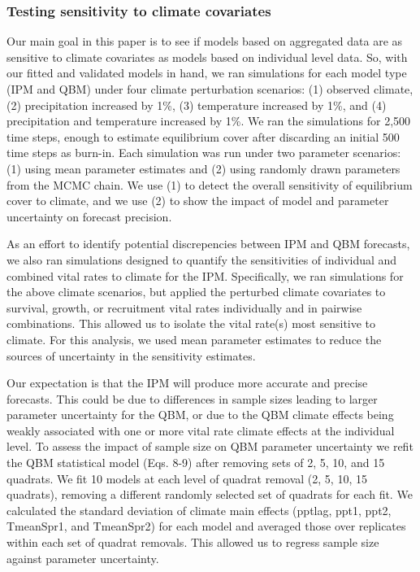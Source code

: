\documentclass[12pt,]{article}
\begin{document}
\subsubsection{Testing sensitivity to climate
covariates}\label{testing-sensitivity-to-climate-covariates}

Our main goal in this paper is to see if models based on aggregated data
are as sensitive to climate covariates as models based on individual
level data. So, with our fitted and validated models in hand, we ran
simulations for each model type (IPM and QBM) under four climate
perturbation scenarios: (1) observed climate, (2) precipitation
increased by 1\%, (3) temperature increased by 1\%, and (4)
precipitation and temperature increased by 1\%. We ran the simulations
for 2,500 time steps, enough to estimate equilibrium cover after
discarding an initial 500 time steps as burn-in. Each simulation was run
under two parameter scenarios: (1) using mean parameter estimates and
(2) using randomly drawn parameters from the MCMC chain. We use (1) to
detect the overall sensitivity of equilibrium cover to climate, and we
use (2) to show the impact of model and parameter uncertainty on
forecast precision.

As an effort to identify potential discrepencies between IPM and QBM
forecasts, we also ran simulations designed to quantify the
sensitivities of individual and combined vital rates to climate for the
IPM. Specifically, we ran simulations for the above climate scenarios,
but applied the perturbed climate covariates to survival, growth, or
recruitment vital rates individually and in pairwise combinations. This
allowed us to isolate the vital rate(s) most sensitive to climate. For
this analysis, we used mean parameter estimates to reduce the sources of
uncertainty in the sensitivity estimates.

Our expectation is that the IPM will produce more accurate and precise
forecasts. This could be due to differences in sample sizes leading to
larger parameter uncertainty for the QBM, or due to the QBM climate
effects being weakly associated with one or more vital rate climate
effects at the individual level. To assess the impact of sample size on
QBM parameter uncertainty we refit the QBM statistical model (Eqs. 8-9)
after removing sets of 2, 5, 10, and 15 quadrats. We fit 10 models at
each level of quadrat removal (2, 5, 10, 15 quadrats), removing a
different randomly selected set of quadrats for each fit. We calculated
the standard deviation of climate main effects (pptlag, ppt1, ppt2,
TmeanSpr1, and TmeanSpr2) for each model and averaged those over
replicates within each set of quadrat removals. This allowed us to
regress sample size against parameter uncertainty.
\end{document}
